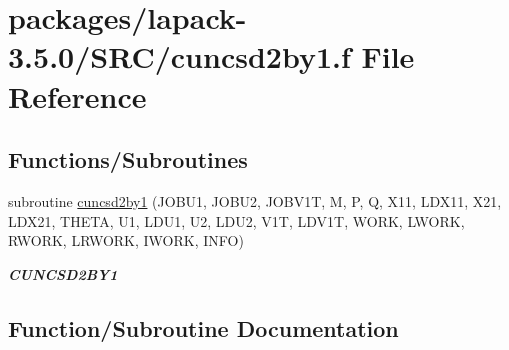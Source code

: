 \hypertarget{cuncsd2by1_8f}{}\section{packages/lapack-\/3.5.0/\+S\+R\+C/cuncsd2by1.f File Reference}
\label{cuncsd2by1_8f}
\subsection*{Functions/\+Subroutines}
\begin{DoxyCompactItemize}
\item 
subroutine \hyperlink{cuncsd2by1_8f_ad246767c55158661b5f34d5721e15a8f}{cuncsd2by1} (J\+O\+B\+U1, J\+O\+B\+U2, J\+O\+B\+V1\+T, M, P, Q, X11, L\+D\+X11, X21, L\+D\+X21, T\+H\+E\+T\+A, U1, L\+D\+U1, U2, L\+D\+U2, V1\+T, L\+D\+V1\+T, W\+O\+R\+K, L\+W\+O\+R\+K, R\+W\+O\+R\+K, L\+R\+W\+O\+R\+K, I\+W\+O\+R\+K, I\+N\+F\+O)
\begin{DoxyCompactList}\small\item\em {\bfseries C\+U\+N\+C\+S\+D2\+B\+Y1} \end{DoxyCompactList}\end{DoxyCompactItemize}


\subsection{Function/\+Subroutine Documentation}
\hypertarget{cuncsd2by1_8f_ad246767c55158661b5f34d5721e15a8f}{}
